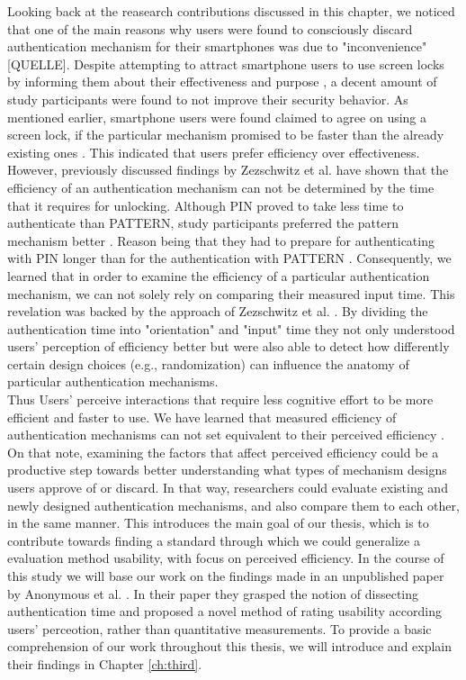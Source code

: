 Looking back at the reasearch contributions discussed in this chapter, we noticed that one of the main reasons why users were found to consciously discard authentication mechanism for their smartphones was due to "inconvenience" [QUELLE]. Despite attempting to attract smartphone users to use screen locks by informing them about their effectiveness and purpose \cite{Albayram:2017:BUL:3235924.3235929}, a decent amount of study participants were found to not improve their security behavior. As mentioned earlier, smartphone users were found claimed to agree on using a screen lock, if the particular mechanism promised to be faster than the already existing ones \cite{AnatomySmartphone}. This indicated that users prefer efficiency over effectiveness. However, previously discussed findings by Zezschwitz et al. \cite{PatternWild} have shown that the efficiency of an authentication mechanism can not be determined by the time that it requires for unlocking. Although PIN proved to take less time to authenticate than PATTERN, study participants preferred the pattern mechanism better \cite{PatternWild}. Reason being that they had to prepare for authenticating with PIN longer than for the authentication with PATTERN \cite{AnatomySmartphone}. Consequently, we learned that in order to examine the efficiency of a particular authentication mechanism, we can not solely rely on comparing their measured input time. This revelation was backed by the approach of Zezschwitz et al. \cite{Marbles}. By dividing the authentication time into "orientation" and "input" time they not only understood users' perception of efficiency better but were also able to detect how differently certain design choices (e.g., randomization) can influence the anatomy of particular authentication mechanisms. \\

Thus Users' perceive interactions that require less cognitive effort to be more efficient and faster to use. We have learned that measured efficiency of authentication mechanisms can not set equivalent to their perceived efficiency \cite{anonymous}. On that note, examining the factors that affect perceived efficiency could be a productive step towards better understanding what types of mechanism designs users approve of or discard. In that way, researchers could evaluate existing and newly designed authentication mechanisms, and also compare them to each other, in the same manner. This introduces the main goal of our thesis, which is to contribute towards finding a standard through which we could generalize a evaluation method usability, with focus on perceived efficiency. In the course of this study we will base our work on the findings made in an unpublished paper by Anonymous et al. \cite{anonymous}. In their paper they grasped the notion of dissecting authentication time and proposed a novel method of rating usability according users' perceotion, rather than quantitative measurements. To provide a basic comprehension of our work throughout this thesis, we will introduce and explain their findings in Chapter \ref{ch:third}. 






